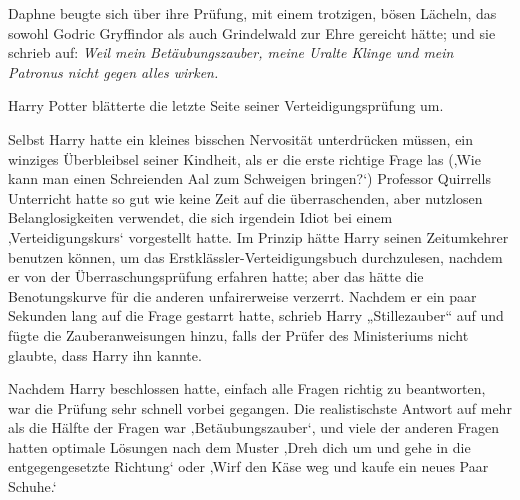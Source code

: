 Daphne beugte sich über ihre Prüfung, mit einem trotzigen, bösen Lächeln, das sowohl Godric Gryffindor als auch Grindelwald zur Ehre gereicht hätte; und sie schrieb auf:
\emph{Weil mein Betäubungszauber, meine Uralte Klinge und mein Patronus nicht gegen alles wirken.}

\later

Harry Potter blätterte die letzte Seite seiner Verteidigungsprüfung um.

Selbst Harry hatte ein kleines bisschen Nervosität unterdrücken müssen, ein winziges Überbleibsel seiner Kindheit, als er die erste richtige Frage las
(‚Wie kann man einen Schreienden Aal zum Schweigen bringen?‘)
Professor Quirrells Unterricht hatte so gut wie keine Zeit auf die überraschenden, aber nutzlosen Belanglosigkeiten verwendet, die sich irgendein Idiot bei einem ‚Verteidigungskurs‘ vorgestellt hatte. Im Prinzip hätte Harry seinen Zeitumkehrer benutzen können, um das Erstklässler-Verteidigungsbuch durchzulesen, nachdem er von der Überraschungsprüfung erfahren hatte; aber das hätte die Benotungskurve für die anderen unfairerweise verzerrt.
Nachdem er ein paar Sekunden lang auf die Frage gestarrt hatte, schrieb Harry „Stillezauber“ auf und fügte die Zauberanweisungen hinzu, falls der Prüfer des Ministeriums nicht glaubte, dass Harry ihn kannte.

Nachdem Harry beschlossen hatte, einfach alle Fragen richtig zu beantworten, war die Prüfung sehr schnell vorbei gegangen. Die realistischste Antwort auf mehr als die Hälfte der Fragen war ‚Betäubungszauber‘, und viele der anderen Fragen hatten optimale Lösungen nach dem Muster ‚Dreh dich um und gehe in die entgegengesetzte Richtung‘ oder ‚Wirf den Käse weg und kaufe ein neues Paar Schuhe.‘

